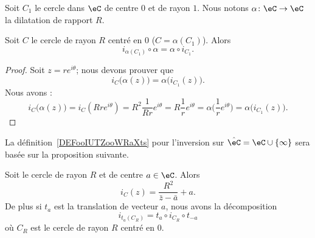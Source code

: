 Soit \( C_1\) le cercle dans \( \eC\) de centre \( 0\) et de rayon \( 1\). Nous notons \( \alpha\colon \eC\to \eC\) la dilatation de rapport \( R\).

\begin{proposition}          \label{PROPooYHQVooVFamhr}
	Soit \( C\) le cercle de rayon \( R\) centré en \( 0\) (\( C=\alpha(C_1)\)). Alors
	\begin{equation}
		i_{\alpha(C_1)}\circ \alpha=\alpha\circ i_{C_1}.
	\end{equation}
\end{proposition}

\begin{proof}
	Soit \( z=r e^{i\theta}\); nous devons prouver que
	\begin{equation}
		i_C\big( \alpha(z) \big)=\alpha\big( i_{C_1}(z) \big).
	\end{equation}
	Nous avons :
	\begin{equation}
		i_C\big( \alpha(z) \big)=i_C(Rr e^{i\theta})=R^2\frac{1}{ Rr } e^{i\theta}=R\frac{1}{ r } e^{i\theta}=\alpha\big( \frac{1}{ r } e^{i\theta} \big)=\alpha\big( i_{C_1}(z) \big).
	\end{equation}
\end{proof}

La définition~\ref{DEFooIUTZooWRaXts} pour l'inversion sur \( \hat \eC=\eC\cup\{ \infty \}\) sera basée sur la proposition suivante.
\begin{proposition}      \label{PROPooEWXNooNshvHq}
	Soit le cercle de rayon \( R\) et de centre \( a\in \eC\). Alors
	\begin{equation}        \label{EQooEQEFooHtJuje}
		i_C(z)=\frac{ R^2 }{ \bar z-\bar a }+a.
	\end{equation}
	De plus si \( t_a\) est la translation de vecteur \( a\), nous avons la décomposition
	\begin{equation}
		i_{t_a(C_R)}=t_a\circ i_{C_R}\circ t_{-a}
	\end{equation}
	où \( C_R\) est le cercle de rayon \( R\) centré en \( 0\).
\end{proposition}

